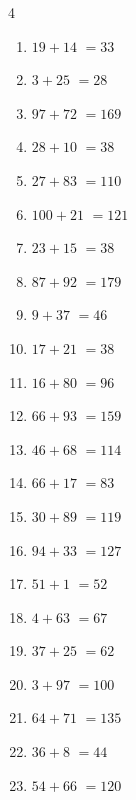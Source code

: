 \begin{multicols}{4}
\begin{enumerate}
\columnbreak %

\resetques

  \item $19+14$
        $=33$

  \item $3+25$
        $=28$

  \item $97+72$
        $=169$

  \item $28+10$
        $=38$

  \item $27+83$
        $=110$

  \item $100+21$
        $=121$

  \item $23+15$
        $=38$

  \item $87+92$
        $=179$

  \item $9+37$
        $=46$

  \item $17+21$
        $=38$

  \item $16+80$
        $=96$

  \item $66+93$
        $=159$

  \item $46+68$
        $=114$

  \item $66+17$
        $=83$

  \item $30+89$
        $=119$

  \item $94+33$
        $=127$

  \item $51+1$
        $=52$

  \item $4+63$
        $=67$

  \item $37+25$
        $=62$

  \item $3+97$
        $=100$

  \item $64+71$
        $=135$

  \item $36+8$
        $=44$

  \item $54+66$
        $=120$


\end{enumerate}
\end{multicols}

